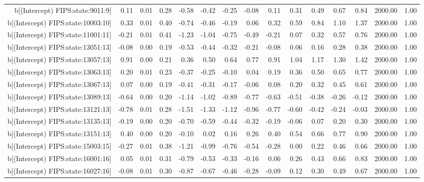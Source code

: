 \begin{table}[ht]
\begin{tabular}{rrrrrrrrrrrrrrr}
  b[(Intercept) FIPS:state:9011:9] & 0.11 & 0.01 & 0.28 & -0.58 & -0.42 & -0.25 & -0.08 & 0.11 & 0.31 & 0.49 & 0.67 & 0.84 & 2000.00 & 1.00 \\ 
  b[(Intercept) FIPS:state:10003:10] & 0.33 & 0.01 & 0.40 & -0.74 & -0.46 & -0.19 & 0.06 & 0.32 & 0.59 & 0.84 & 1.10 & 1.37 & 2000.00 & 1.00 \\ 
  b[(Intercept) FIPS:state:11001:11] & -0.21 & 0.01 & 0.41 & -1.23 & -1.04 & -0.75 & -0.49 & -0.21 & 0.07 & 0.32 & 0.57 & 0.76 & 2000.00 & 1.00 \\ 
  b[(Intercept) FIPS:state:13051:13] & -0.08 & 0.00 & 0.19 & -0.53 & -0.44 & -0.32 & -0.21 & -0.08 & 0.06 & 0.16 & 0.28 & 0.38 & 2000.00 & 1.00 \\ 
  b[(Intercept) FIPS:state:13057:13] & 0.91 & 0.00 & 0.21 & 0.36 & 0.50 & 0.64 & 0.77 & 0.91 & 1.04 & 1.17 & 1.30 & 1.42 & 2000.00 & 1.00 \\ 
  b[(Intercept) FIPS:state:13063:13] & 0.20 & 0.01 & 0.23 & -0.37 & -0.25 & -0.10 & 0.04 & 0.19 & 0.36 & 0.50 & 0.65 & 0.77 & 2000.00 & 1.00 \\ 
  b[(Intercept) FIPS:state:13067:13] & 0.07 & 0.00 & 0.19 & -0.41 & -0.31 & -0.17 & -0.06 & 0.08 & 0.20 & 0.32 & 0.45 & 0.61 & 2000.00 & 1.00 \\ 
  b[(Intercept) FIPS:state:13089:13] & -0.64 & 0.00 & 0.20 & -1.14 & -1.02 & -0.89 & -0.77 & -0.63 & -0.51 & -0.38 & -0.26 & -0.12 & 2000.00 & 1.00 \\ 
  b[(Intercept) FIPS:state:13121:13] & -0.78 & 0.01 & 0.28 & -1.51 & -1.33 & -1.12 & -0.96 & -0.77 & -0.60 & -0.42 & -0.24 & -0.03 & 2000.00 & 1.00 \\ 
  b[(Intercept) FIPS:state:13135:13] & -0.19 & 0.00 & 0.20 & -0.70 & -0.59 & -0.44 & -0.32 & -0.19 & -0.06 & 0.07 & 0.20 & 0.30 & 2000.00 & 1.00 \\ 
  b[(Intercept) FIPS:state:13151:13] & 0.40 & 0.00 & 0.20 & -0.10 & 0.02 & 0.16 & 0.26 & 0.40 & 0.54 & 0.66 & 0.77 & 0.90 & 2000.00 & 1.00 \\ 
  b[(Intercept) FIPS:state:15003:15] & -0.27 & 0.01 & 0.38 & -1.21 & -0.99 & -0.76 & -0.54 & -0.28 & 0.00 & 0.22 & 0.46 & 0.66 & 2000.00 & 1.00 \\ 
  b[(Intercept) FIPS:state:16001:16] & 0.05 & 0.01 & 0.31 & -0.79 & -0.53 & -0.33 & -0.16 & 0.06 & 0.26 & 0.43 & 0.66 & 0.83 & 2000.00 & 1.00 \\ 
  b[(Intercept) FIPS:state:16027:16] & -0.08 & 0.01 & 0.30 & -0.87 & -0.67 & -0.46 & -0.28 & -0.09 & 0.12 & 0.30 & 0.49 & 0.67 & 2000.00 & 1.00 \\ 

\end{tabular}
\end{table}
